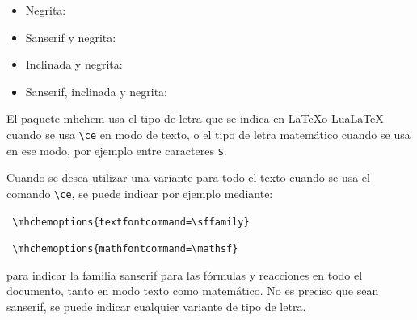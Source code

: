 \begin{itemize}
\item Negrita:
    
  \begin{SideBySideExample}[xrightmargin=2cm]
    {\bfseries{}}
  \end{SideBySideExample}

\item Sanserif y negrita:
  
  \begin{SideBySideExample}[xrightmargin=2cm]
    {\sffamily\bfseries{}}
  \end{SideBySideExample}

\item Inclinada y negrita:
  
  \begin{SideBySideExample}[xrightmargin=2cm]
    {\slshape\bfseries{}}
  \end{SideBySideExample}

\item Sanserif, inclinada y negrita:
  
  \begin{SideBySideExample}[xrightmargin=2cm]
    {\sffamily\slshape\bfseries{}}
  \end{SideBySideExample}
  
\end{itemize}

El paquete {\sffamily mhchem} usa el tipo de letra que se indica en \LaTeX o Lua\LaTeX
cuando se usa \texttt{\textbackslash ce} en modo de texto, o el tipo de letra matemático
cuando se usa en ese modo, por ejemplo entre caracteres \texttt{\$}.

Cuando se desea utilizar una variante para todo el texto cuando se usa el comando
\texttt{\textbackslash ce}, se puede indicar por ejemplo mediante:

\vspace{1ex}
\texttt{%
  \textbackslash mhchemoptions\{textfontcommand=\textbackslash sffamily\}
}

\vspace{1ex}
\texttt{%
  \textbackslash mhchemoptions\{mathfontcommand=\textbackslash mathsf\}
}

\vspace{1ex}
 para indicar la familia {\sffamily sanserif} para las fórmulas y reacciones en
todo el documento, tanto en modo texto como matemático. No es preciso que sean
{\sffamily sanserif}, se puede indicar cualquier variante de tipo de letra.

